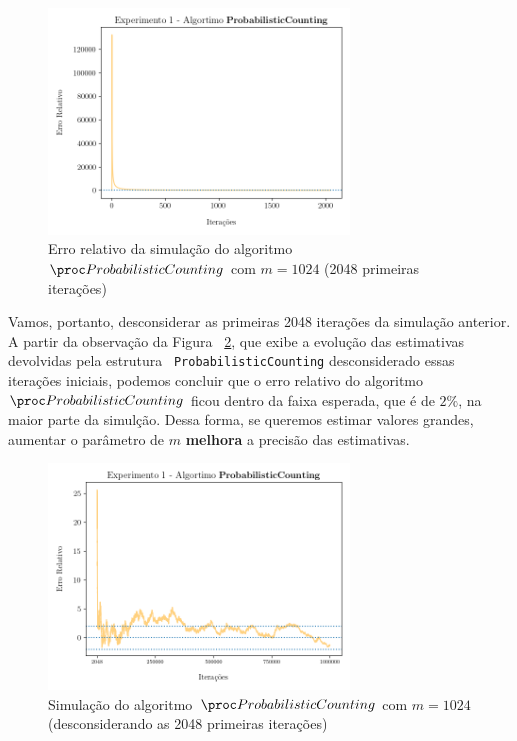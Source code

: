 \begin{figure}[h]
  \centering
  \includegraphics[height=6cm, width=\textwidth]{figuras/probabilistic_counting_erro_first_1024.png}
	\caption{Erro relativo da simulação do algoritmo~$\pc$ com $m = 1024$ (2048 primeiras iterações)}
  \label{fig:pc:1024:first:erro}
\end{figure}

\newpage
Vamos, portanto, desconsiderar as primeiras 2048 iterações da simulação anterior. A partir da observação da Figura~
\ref{fig:pc:1024:erro:sem:first}, que exibe a evolução das estimativas devolvidas pela estrutura
~\texttt{ProbabilisticCounting} desconsiderado essas iterações iniciais, podemos concluir que o erro relativo do 
algoritmo~$\pc$ ficou dentro da faixa esperada, que é de $2\%$, na maior parte da simulção. Dessa forma, se queremos 
estimar valores grandes, aumentar o parâmetro de $m$ \textbf{melhora} a precisão das estimativas.

\begin{figure}[h]
  \centering
  \includegraphics[height=6cm, width=\textwidth]{figuras/probabilistic_counting_erro_sem_first_1024.png}
	\caption{Simulação do algoritmo~$\pc$ com $m = 1024$ (desconsiderando as 2048 primeiras iterações)}
  \label{fig:pc:1024:erro:sem:first}
\end{figure}

